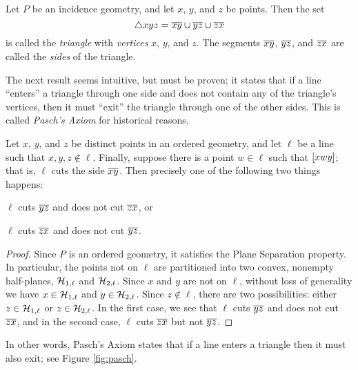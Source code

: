 \begin{dfn}[Triangle]
Let \(P\) be an incidence geometry, and let \(x\), \(y\), and \(z\) be points.
Then the set \[ \bigtriangleup{xyz} = \overline{xy} \cup \overline{yz} \cup \overline{zx} \] is called the \emph{triangle} with \emph{vertices} \(x\), \(y\), and \(z\).
The segments \(\overline{xy}\), \(\overline{yz}\), and \(\overline{zx}\) are called the \emph{sides} of the triangle.
\end{dfn}

The next result seems intuitive, but must be proven; it states that if a line ``enters'' a triangle through one side and does not contain any of the triangle's vertices, then it must ``exit'' the triangle through one of the other sides.
This is called \emph{Pasch's Axiom} for historical reasons.

\begin{prop}
Let \(x\), \(y\), and \(z\) be distinct points in an ordered geometry, and let \(\ell\) be a line such that \(x,y,z \notin \ell\).
Finally, suppose there is a point \(w \in \ell\) such that \([ x w y ]\); that is, \(\ell\) cuts the side \(\overline{xy}\).
Then precisely one of the following two things happens:
\begin{proplist}
\item \(\ell\) cuts \(\overline{yz}\) and does not cut \(\overline{zx}\), or
\item \(\ell\) cuts \(\overline{zx}\) and does not cut \(\overline{yz}\).
\end{proplist}
\end{prop}

\begin{proof}
Since \(P\) is an ordered geometry, it satisfies the Plane Separation property.
In particular, the points not on \(\ell\) are partitioned into two convex, nonempty half-planes, \(\mathcal{H}_{1,\ell}\) and \(\mathcal{H}_{2,\ell}\).
Since \(x\) and \(y\) are not on \(\ell\), without loss of generality we have \(x \in \mathcal{H}_{1,\ell}\) and \(y \in \mathcal{H}_{2,\ell}\).
Since \(z \notin \ell\), there are two possibilities: either \(z \in \mathcal{H}_{1,\ell}\) or \(z \in \mathcal{H}_{2,\ell}\).
In the first case, we see that \(\ell\) cuts \(\overline{yz}\) and does not cut \(\overline{zx}\), and in the second case, \(\ell\) cuts \(\overline{zx}\) but not \(\overline{yz}\).
\end{proof}

In other words, Pasch's Axiom states that if a line enters a triangle then it must also exit; see Figure \ref{fig:pasch}.

